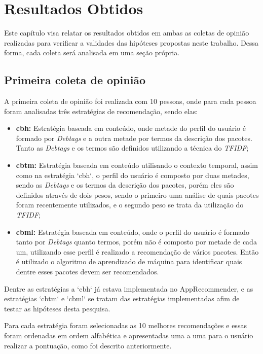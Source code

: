 \chapter[Resultados Obtidos]{Resultados Obtidos}

Este capítulo visa relatar os resultados obtidos em ambas as coletas de opinião
realizadas para verificar a validades das hipóteses propostas neste trabalho.
Dessa forma, cada coleta será analisada em uma seção própria.

\section{Primeira coleta de opinião}

A primeira coleta de opinião foi realizada com 10 pessoas, onde para cada
pessoa foram analisadas três estratégias de recomendação, sendo elas:

\begin{itemize}
    \item \textbf{cbh:} Estratégia baseada em conteúdo, onde metade do
    perfil do usuário é formado por \textit{Debtags} e a outra metade por termos
    da descrição dos pacotes. Tanto as \textit{Debtags} e os termos são definidos
        utilizando a técnica do \textit{TFIDF};
    \item \textbf{cbtm:} Estratégia baseada em conteúdo utilisando o contexto
    temporal, assim como na estratégia `cbh`, o perfil do usuário é composto
    por duas metades, sendo as \textit{Debtags} e os termos da descrição dos pacotes,
    porém eles são definidos através de dois pesos, sendo o primeiro uma
    análise de quais pacotes foram recentemente utilizados, e o segundo peso
    se trata da utilização do \textit{TFIDF};
    \item \textbf{cbml:} Estratégia baseada em conteúdo, onde o perfil do
    usuário é formado tanto por \textit{Debtags} quanto termos, porém não é composto
    por metade de cada um, utilizando esse perfil é realizado a
    recomendação de vários pacotes. Então é utilizado o algoritmo de
    aprendizado de máquina para identificar quais dentre esses pacotes
    devem ser recomendados.
\end{itemize}

Dentre as estratégias a `cbh` já estava implementada no AppRecommender, e as
estratégias `cbtm` e `cbml` se tratam das estratégias implementadas afim de
testar as hipóteses desta pesquisa.

Para cada estratégia foram selecionadas as 10 melhores recomendações
e essas foram ordenadas em ordem alfabética e apresentadas uma a uma para
o usuário realizar a pontuação, como foi descrito anteriormente.

